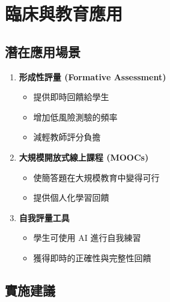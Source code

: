 \documentclass[12pt,a4paper]{article}
\begin{document}
\section{臨床與教育應用}

\subsection{潛在應用場景}

\begin{enumerate}[leftmargin=2em]
    \item \textbf{形成性評量 (Formative Assessment)}
    \begin{itemize}
        \item 提供即時回饋給學生
        \item 增加低風險測驗的頻率
        \item 減輕教師評分負擔
    \end{itemize}

    \item \textbf{大規模開放式線上課程 (MOOCs)}
    \begin{itemize}
        \item 使簡答題在大規模教育中變得可行
        \item 提供個人化學習回饋
    \end{itemize}

    \item \textbf{自我評量工具}
    \begin{itemize}
        \item 學生可使用 AI 進行自我練習
        \item 獲得即時的正確性與完整性回饋
    \end{itemize}
\end{enumerate}

\subsection{實施建議}

\end{document}
